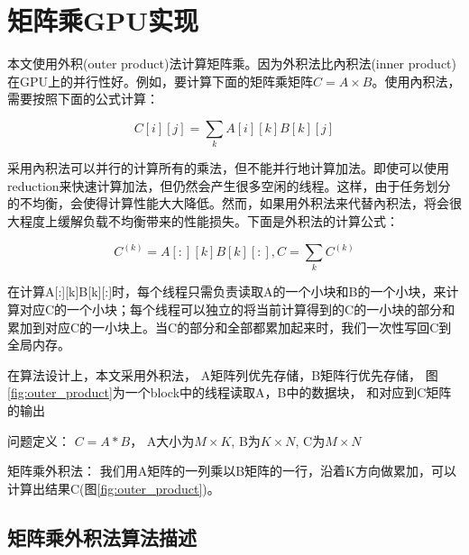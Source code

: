 \chapter{矩阵乘GPU实现}\label{chap:GEMMGPU}

本文使用外积(outer product)法计算矩阵乘。因为外积法比內积法(inner product)在GPU上的并行性好。例如，要计算下面的矩阵乘矩阵$C=A \times B$。使用內积法，需要按照下面的公式计算：

\begin{equation}
\label{eq:innerproduct}
C[i][j]=\sum_{k}A[i][k]B[k][j]
\end{equation}

采用內积法可以并行的计算所有的乘法，但不能并行地计算加法。即使可以使用reduction来快速计算加法，但仍然会产生很多空闲的线程。这样，由于任务划分的不均衡，会使得计算性能大大降低。然而，如果用外积法来代替內积法，将会很大程度上缓解负载不均衡带来的性能损失。下面是外积法的计算公式：

\begin{equation}
\label{eq:outerproduct}
C^{(k)}=A[:][k]B[k][:], C=\sum_{k}C^{(k)}
\end{equation}

在计算A[:][k]B[k][:]时，每个线程只需负责读取A的一个小块和B的一个小块，来计算对应C的一个小块；每个线程可以独立的将当前计算得到的C的一小块的部分和累加到对应C的一小块上。当C的部分和全部都累加起来时，我们一次性写回C到全局内存。

在算法设计上，本文采用外积法， A矩阵列优先存储，B矩阵行优先存储， 图\ref{fig:outer_product}为一个block中的线程读取A，B中的数据块， 和对应到C矩阵的输出

问题定义： $C = A * B$， A大小为$M \times K$, B为$K \times N$, C为$M \times N$

矩阵乘外积法： 我们用A矩阵的一列乘以B矩阵的一行，沿着K方向做累加，可以计算出结果C(图\ref{fig:outer_product})。

\section{矩阵乘外积法算法描述}

